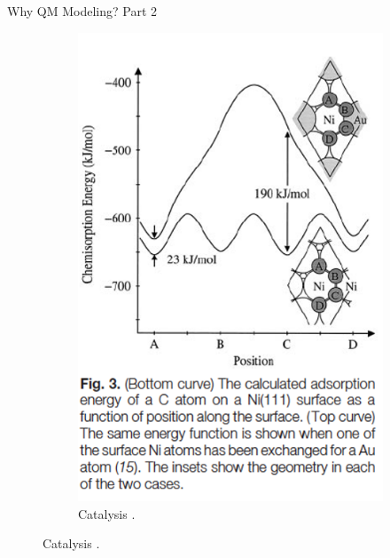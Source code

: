 \documentclass[aspectratio=169]{beamer}
\begin{document}
\begin{frame}{Why QM Modeling? Part 2}
\begin{figure}
\begin{subfigure}{0.2\linewidth}
    \includegraphics[width=\linewidth]{lectures/figures/0.4_catalysis.png}
    \caption{Catalysis \cite{besenbacherDesignSurfaceAlloy1998}.}
    \end{subfigure}
\end{figure}
\end{frame}
\end{document}
